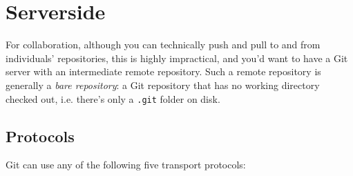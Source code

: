 \documentclass[table, xcdraw]{article}%
\begin{document}
\section{Serverside} 

For collaboration, although you can technically push and pull to and from individuals' repositories, this is highly impractical, and you'd want to have a Git server with an intermediate remote repository. Such a remote repository is generally a \emph{bare repository}: a Git repository that has no working directory checked out, i.e. there's only a \texttt{.git} folder on disk.

\subsection{Protocols} \label{protocols}

Git can use any of the following five transport protocols:
\end{document}
